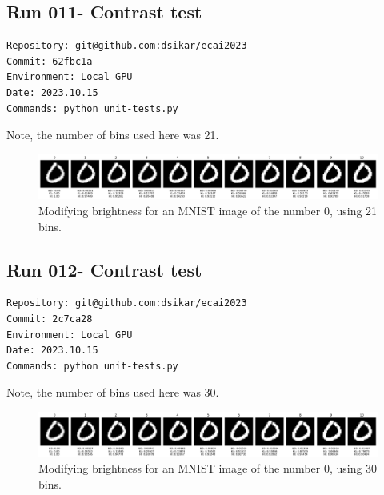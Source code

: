 \subsection{Run 011- Contrast test}
\label{app_res:011}
\begin{verbatim}
Repository: git@github.com:dsikar/ecai2023
Commit: 62fbc1a
Environment: Local GPU
Date: 2023.10.15
Commands: python unit-tests.py
\end{verbatim}

Note, the number of bins used here was 21.

\begin{figure}[h]
\begin{center}
\includegraphics[width=\textwidth]{Figures/Appendixes/brightenss_perturbations_21_bins_27d2880.png}
\end{center}
\caption{Modifying brightness for an MNIST image of the number 0, using 21 bins.}
\end{figure}

\subsection{Run 012- Contrast test}
\label{app_res:012}
\begin{verbatim}
Repository: git@github.com:dsikar/ecai2023
Commit: 2c7ca28
Environment: Local GPU
Date: 2023.10.15
Commands: python unit-tests.py
\end{verbatim}

Note, the number of bins used here was 30.

\begin{figure}[h]
\begin{center}
\includegraphics[width=\textwidth]{Figures/Appendixes/brightness_perturbations_30_bins.png}
\end{center}
\caption{Modifying brightness for an MNIST image of the number 0, using 30 bins.}
\end{figure}


